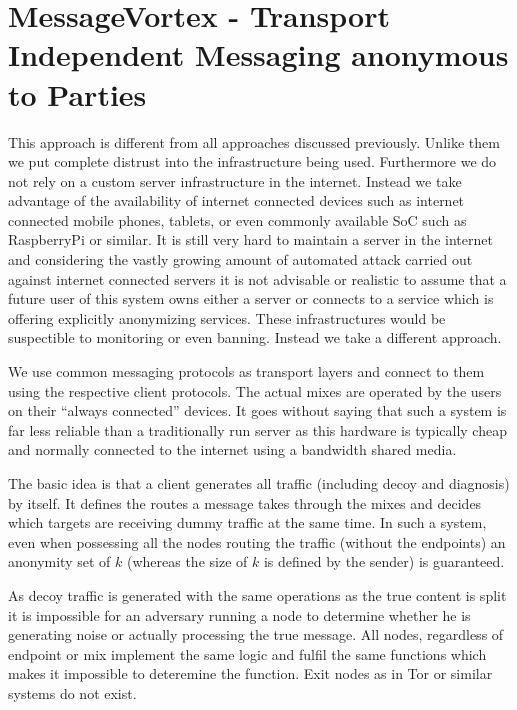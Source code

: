 \chapter{MessageVortex - Transport Independent Messaging anonymous to  Parties\label{sec:spec}}
This approach is different from all approaches discussed previously. Unlike them we put complete distrust into the infrastructure being used. Furthermore we do not rely on a custom server infrastructure in the internet. Instead we take advantage of the availability of internet connected devices such as internet connected mobile phones, tablets, or even commonly available SoC such as RaspberryPi or similar. It is still very hard to maintain a server in the internet and considering the vastly growing amount of automated attack carried out against internet connected servers it is not advisable or realistic to assume that a future user of this system owns either a server or connects to a service which is offering explicitly anonymizing services. These infrastructures would be suspectible to monitoring or even banning. Instead we take a different approach.

We use common messaging protocols as transport layers and connect to them using the respective client protocols. The actual mixes are operated by the users on their ``always connected'' devices. It goes without saying that such a system is far less reliable than a traditionally run server as this hardware is typically cheap and normally connected to the internet using a bandwidth shared media.

The basic idea is that a client generates all traffic (including decoy and diagnosis) by itself. It defines the routes a message takes through the mixes and decides which targets are receiving dummy traffic at the same time. In such a system, even when possessing all the nodes routing the traffic (without the endpoints) an anonymity set of $k$ (whereas the size of $k$ is defined by the sender) is guaranteed.

As decoy traffic is generated with the same operations as the true content is split it is impossible for an adversary running a node to determine whether he is generating noise or actually processing the true message.
All nodes, regardless of endpoint or mix implement the same logic and fulfil the same functions which makes it impossible to deteremine the function. Exit nodes as in Tor or similar systems do not exist.


%

